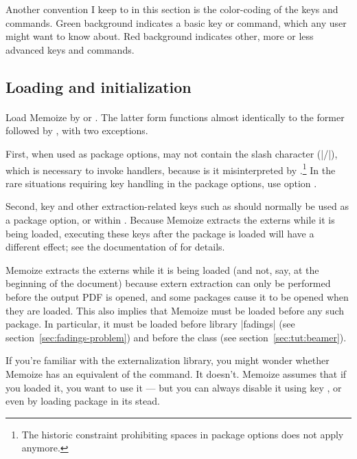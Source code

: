 \documentclass[a4paper,11pt]{article}
\begin{document}
Another convention I keep to in this section is the color-coding of the keys
and commands.  Green background indicates a basic key or command, which any
user might want to know about.  Red background indicates other, more or less
advanced keys and commands.


\subsection{Loading and initialization}
\label{sec:ref:loading}
\paragraph{}

Load Memoize by  or
.  The latter form functions
almost identically to the former followed by
, with two exceptions.

First, when used as package options,  may not contain the slash
character (|/|), which is necessary to invoke  handlers, because
is it misinterpreted by .\footnote{The historic 
  constraint prohibiting spaces in package options does not apply anymore.}  In
the rare situations requiring key handling in the package options, use option
.

Second, key  and other extraction-related keys such as
 should normally be used as a package option,
or within .  Because Memoize extracts the externs while it
is being loaded, executing these keys after the package is loaded will have a
different effect; see the documentation of  for details.

Memoize extracts the externs while it is being loaded (and not, say, at the
beginning of the document) because extern extraction can only be performed
before the output PDF is opened, and some packages cause it to be opened when
they are loaded.  This also implies that Memoize must be loaded before any such
package.  In particular, it must be loaded before \PGF library |fadings| (see
section~\ref{sec:fadings-problem}) and before the  class (see
section~\ref{sec:tut:beamer}).

If you're familiar with the \TikZ externalization library, you might wonder
whether Memoize has an equivalent of the  command.  It
doesn't.  Memoize assumes that if you loaded it, you want to use it --- but you
can always disable it using key , or even by loading package
 in its stead.
\end{document}
